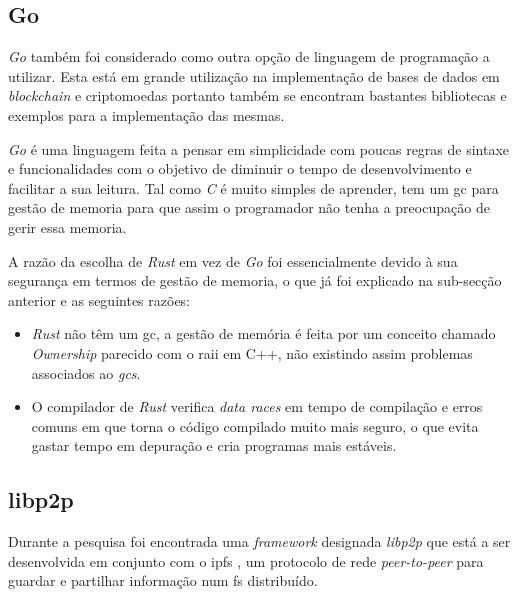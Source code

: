 \subsection{Go}
\label{go}
\textit{Go} também foi considerado como outra opção de linguagem de programação a utilizar.
Esta está em grande utilização na implementação de bases de dados em \textit{blockchain} e criptomoedas portanto também se encontram bastantes bibliotecas e exemplos para a implementação das mesmas.

\textit{Go} é uma linguagem feita a pensar em simplicidade com poucas regras de sintaxe e funcionalidades com o objetivo de diminuir o tempo de desenvolvimento e facilitar a sua leitura. Tal como \textit{C} é muito simples de aprender, tem um \gls{gc} para gestão de memoria para que assim o programador não tenha a preocupação de gerir essa memoria.

A razão da escolha de \textit{Rust} em vez de \textit{Go} foi essencialmente devido à sua segurança em termos de gestão de memoria, o que já foi explicado na sub-secção anterior e as seguintes razões:



\begin{itemize}
    \item
          \textit{Rust} não têm um \gls{gc}, a gestão de memória é feita por um conceito chamado \textit{Ownership} parecido com o \gls{raii} em C++, não existindo assim problemas associados ao \textit{\glspl{gc}}.

    \item
          O compilador de \textit{Rust} verifica \textit{data races} em tempo de compilação e erros comuns em que torna o código compilado muito mais seguro, o que evita gastar tempo em depuração e cria programas mais estáveis.

\end{itemize}

\subsection{libp2p}

Durante a pesquisa foi encontrada uma \textit{framework} designada \textit{libp2p} que está a ser desenvolvida em conjunto com o \acrfull{ipfs}
\cite{libp2p_solve}, um protocolo de rede \textit{peer-to-peer} para guardar e partilhar informação num \acrfull{fs} distribuído. \cite{ipfs_wiki}


